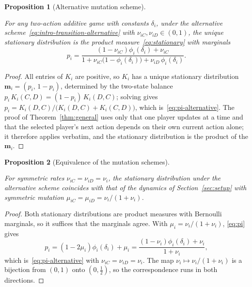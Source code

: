 \documentclass[11pt]{article}
\newtheorem{proposition}{Proposition}
\newcommand{\bfm}{\mathbf{m}}
\begin{document}
\begin{proposition}[Alternative mutation scheme]\label{prop:alternative}

For any two-action additive game with constants \(\delta_i\), under the
alternative scheme~\eqref{eq:intro-transition-alternative} with
\(\nu_{iC},\nu_{iD}\in(0,1)\), the unique stationary distribution is the
product measure~\eqref{eq:stationary} with marginals
\begin{equation}\label{eq:pi-alternative}
  p_i = \frac{(1-\nu_{iC})\phi_i(\delta_i)+\nu_{iC}}
             {1+\nu_{iC}\bigl(1-\phi_i(\delta_i)\bigr)
               +\nu_{iD}\,\phi_i(\delta_i)}.
\end{equation}

\end{proposition}

\begin{proof}

All entries of \(K_i\) are positive, so \(K_i\) has a unique stationary
distribution \(\bfm_i=(p_i,\,1-p_i)\), determined by the two-state balance
\(p_i\,K_i(C,D)=(1-p_i)\,K_i(D,C)\); solving gives
\(p_i=K_i(D,C)/\bigl(K_i(D,C)+K_i(C,D)\bigr)\),
which is~\eqref{eq:pi-alternative}. The proof of Theorem~\ref{thm:general}
uses only that one player updates at a time and that the selected player's
next action depends on their own current action alone; it therefore applies
verbatim, and the stationary distribution is the product of the \(\bfm_i\).

\end{proof}

\begin{proposition}[Equivalence of the mutation schemes]\label{prop:equivalence}

For symmetric rates \(\nu_{iC}=\nu_{iD}=\nu_i\), the stationary distribution
under the alternative scheme coincides with that of the dynamics of
Section~\ref{sec:setup} with symmetric mutation
\(\mu_{iC}=\mu_{iD}=\nu_i/(1+\nu_i)\).

\end{proposition}

\begin{proof}

Both stationary distributions are product measures with Bernoulli marginals,
so it suffices that the marginals agree. With \(\mu_i=\nu_i/(1+\nu_i)\),
\eqref{eq:pi} gives
\[
  p_i = (1-2\mu_i)\phi_i(\delta_i)+\mu_i
      = \frac{(1-\nu_i)\phi_i(\delta_i)+\nu_i}{1+\nu_i},
\]
which is~\eqref{eq:pi-alternative} with \(\nu_{iC}=\nu_{iD}=\nu_i\). The map
\(\nu_i\mapsto\nu_i/(1+\nu_i)\) is a bijection from \((0,1)\) onto
\((0,\tfrac{1}{2})\), so the correspondence runs in both directions.

\end{proof}
\end{document}
